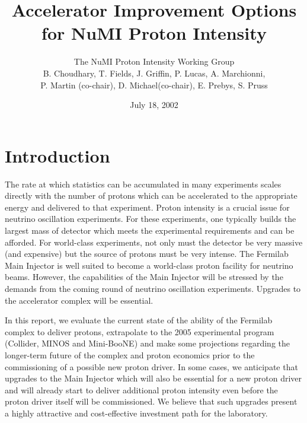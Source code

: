 \documentclass{article}
\title {Accelerator Improvement Options for NuMI Proton Intensity}
\date {July 18, 2002}
\author {The NuMI Proton Intensity Working Group\\
  B. Choudhary, T. Fields, J. Griffin, P. Lucas, A. Marchionni,\\
P. Martin (co-chair), D. Michael(co-chair), E. Prebys, S. Pruss}
\begin{document}
\maketitle
{}

\section {Introduction}

  The rate at which statistics can be accumulated in many experiments scales
directly with the number of protons which can be accelerated to the
appropriate energy and delivered to that experiment. Proton intensity is a 
crucial issue for
neutrino oscillation experiments. For these experiments, one
typically builds the largest mass of detector which meets the experimental
requirements 
and can be afforded. For world-class experiments, not only must the
detector be very massive (and expensive) but the source of protons must be
very intense. The Fermilab Main Injector is well suited to become a world-class
proton facility for neutrino beams. However, the capabilities
of the Main Injector will be stressed by the demands from the coming round
of neutrino oscillation experiments. Upgrades to the accelerator complex
will be essential.

In this report, we evaluate the current state of the ability of the Fermilab
complex to deliver protons, extrapolate to the 2005
experimental program (Collider, MINOS and Mini-BooNE) and make some
projections regarding the longer-term future of the complex and proton
economics prior to the commissioning of a possible new proton driver. 
In some cases,
we anticipate that upgrades to the Main Injector which will also be essential
for a new proton driver and will already start to deliver additional proton
intensity even before the proton driver itself will be commissioned. We
believe that such upgrades present a highly attractive and cost-effective 
investment path for the laboratory.
\end{document}
